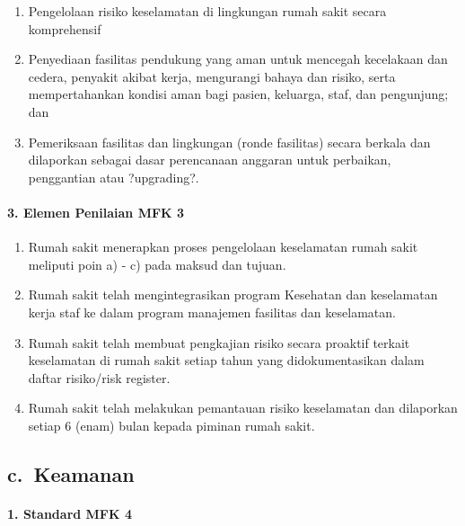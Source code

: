 \documentclass[
]{book}
\providecommand{\tightlist}{%
  \setlength{\itemsep}{0pt}\setlength{\parskip}{0pt}}
\begin{document}
\begin{enumerate}
\def\labelenumi{\alph{enumi}.}
\tightlist
\item
  Pengelolaan risiko keselamatan di lingkungan rumah sakit secara komprehensif
\item
  Penyediaan fasilitas pendukung yang aman untuk mencegah kecelakaan dan cedera, penyakit akibat kerja, mengurangi bahaya dan risiko, serta mempertahankan kondisi aman bagi pasien, keluarga, staf, dan pengunjung; dan
\item
  Pemeriksaan fasilitas dan lingkungan (ronde fasilitas) secara berkala dan dilaporkan sebagai dasar perencanaan anggaran untuk perbaikan, penggantian atau ?upgrading?.
\end{enumerate}

\hypertarget{elemen-penilaian-mfk-3}{%
\paragraph*{3. Elemen Penilaian MFK 3}\label{elemen-penilaian-mfk-3}}

\begin{enumerate}
\def\labelenumi{\alph{enumi}.}
\tightlist
\item
  Rumah sakit menerapkan proses pengelolaan keselamatan rumah sakit meliputi poin a) - c) pada maksud dan tujuan.
\item
  Rumah sakit telah mengintegrasikan program Kesehatan dan keselamatan kerja staf ke dalam program manajemen fasilitas dan keselamatan.
\item
  Rumah sakit telah membuat pengkajian risiko secara proaktif terkait keselamatan di rumah sakit setiap tahun yang didokumentasikan dalam daftar risiko/risk register.
\item
  Rumah sakit telah melakukan pemantauan risiko keselamatan dan dilaporkan setiap 6 (enam) bulan kepada piminan rumah sakit.
\end{enumerate}

\hypertarget{c.-keamanan}{%
\subsection*{c.~Keamanan}\label{c.-keamanan}}

\hypertarget{standard-mfk-4}{%
\paragraph*{1. Standard MFK 4}\label{standard-mfk-4}}
\end{document}
